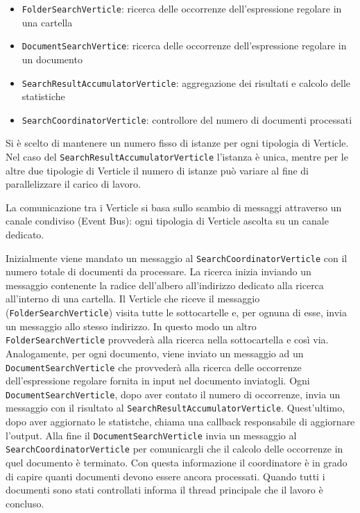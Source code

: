 ﻿\documentclass[a4paper]{article}
\begin{document}
\begin{itemize}
%
    \item \texttt{FolderSearchVerticle}: ricerca delle occorrenze dell'espressione regolare in una cartella
%
    \item \texttt{DocumentSearchVertice}: ricerca delle occorrenze dell'espressione regolare in un documento
%
    \item \texttt{SearchResultAccumulatorVerticle}: aggregazione dei risultati e calcolo delle statistiche
%
    \item \texttt{SearchCoordinatorVerticle}: controllore del numero di documenti processati
%
\end{itemize}

Si \`e scelto di mantenere un numero fisso di istanze per ogni tipologia di Verticle.
%
Nel caso del \texttt{SearchResultAccumulatorVerticle} l'istanza \`e unica, mentre per le altre due tipologie di Verticle il numero di istanze pu\`o variare al fine di parallelizzare il carico di lavoro.

La comunicazione tra i Verticle si basa sullo scambio di messaggi attraverso un canale condiviso (Event Bus): ogni tipologia di Verticle ascolta su un canale dedicato.

Inizialmente viene mandato un messaggio al \texttt{SearchCoordinatorVerticle} con il numero totale di documenti da processare. 
%
La ricerca inizia inviando un messaggio contenente la radice dell'albero all'indirizzo dedicato alla ricerca all'interno di una cartella.
%
Il Verticle che riceve il messaggio (\texttt{FolderSearchVerticle}) visita tutte le sottocartelle e, per ognuna di esse, invia un messaggio allo stesso indirizzo.
%
In questo modo un altro \texttt{FolderSearchVerticle} provveder\`a alla ricerca nella sottocartella e cos\`i via.
%
Analogamente, per ogni documento, viene inviato un messaggio ad un \texttt{DocumentSearchVerticle} che provveder\`a alla ricerca delle occorrenze dell'espressione regolare fornita in input nel documento inviatogli.
%
Ogni \texttt{DocumentSearchVerticle}, dopo aver contato il numero di occorrenze, invia un messaggio con il risultato al \texttt{SearchResultAccumulatorVerticle}. Quest'ultimo, dopo aver aggiornato le statistche, chiama una callback responsabile di aggiornare l'output.
%
Alla fine il \texttt{DocumentSearchVerticle} invia un messaggio al \texttt{SearchCoordinatorVerticle} per comunicargli che il calcolo delle occorrenze in quel documento è terminato. Con questa informazione il coordinatore è in grado di capire quanti documenti devono essere ancora processati.
Quando tutti i documenti sono stati controllati informa il thread principale che il lavoro è concluso.
%
\end{document}
